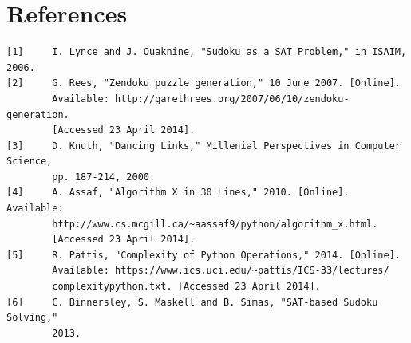 \documentclass[12pt]{article}
\begin{document}
\section{References}
\begin{verbatim}
[1] 	I. Lynce and J. Ouaknine, "Sudoku as a SAT Problem," in ISAIM, 2006. 
[2] 	G. Rees, "Zendoku puzzle generation," 10 June 2007. [Online]. 
        Available: http://garethrees.org/2007/06/10/zendoku-generation.
        [Accessed 23 April 2014].
[3] 	D. Knuth, "Dancing Links," Millenial Perspectives in Computer Science,
        pp. 187-214, 2000. 
[4] 	A. Assaf, "Algorithm X in 30 Lines," 2010. [Online]. Available:
        http://www.cs.mcgill.ca/~aassaf9/python/algorithm_x.html.
        [Accessed 23 April 2014].
[5] 	R. Pattis, "Complexity of Python Operations," 2014. [Online].
        Available: https://www.ics.uci.edu/~pattis/ICS-33/lectures/
        complexitypython.txt. [Accessed 23 April 2014].
[6] 	C. Binnersley, S. Maskell and B. Simas, "SAT-based Sudoku Solving,"
        2013.
\end{verbatim}
\end{document}
